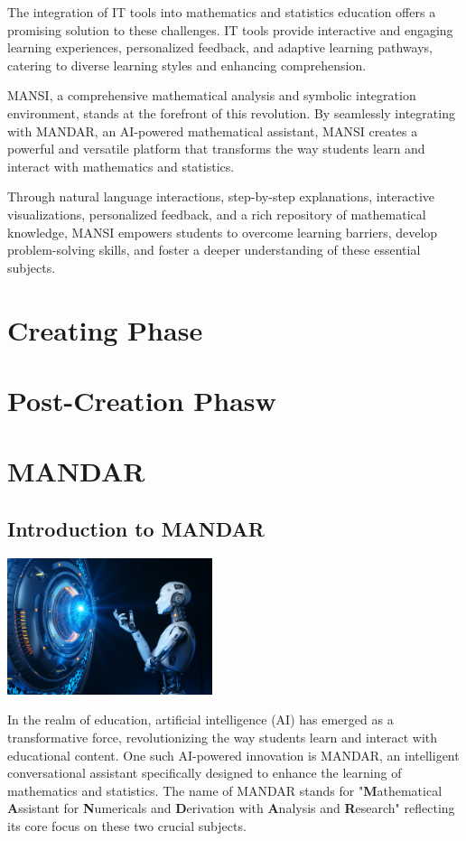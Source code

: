\documentclass[20pt]{report}
\begin{document}
The integration of IT tools into mathematics and statistics education offers a promising solution to these challenges. IT tools provide interactive and engaging learning experiences, personalized feedback, and adaptive learning pathways, catering to diverse learning styles and enhancing comprehension.

MANSI, a comprehensive mathematical analysis and symbolic integration environment, stands at the forefront of this revolution. By seamlessly integrating with MANDAR, an AI-powered mathematical assistant, MANSI creates a powerful and versatile platform that transforms the way students learn and interact with mathematics and statistics.

Through natural language interactions, step-by-step explanations, interactive visualizations, personalized feedback, and a rich repository of mathematical knowledge, MANSI empowers students to overcome learning barriers, develop problem-solving skills, and foster a deeper understanding of these essential subjects.
\chapter{Creating Phase}
\chapter{Post-Creation Phasw}
\chapter{MANDAR}

\section{Introduction to MANDAR}
\begin{center}
    \includegraphics[height=4cm]{AIbot.jpg}
\end{center}
In the realm of education, artificial intelligence (AI) has emerged as a transformative force, revolutionizing the way students learn and interact with educational content. One such AI-powered innovation is MANDAR, an intelligent conversational assistant specifically designed to enhance the learning of mathematics and statistics. The name of MANDAR stands for "\textbf{M}athematical \textbf{A}ssistant for \textbf{N}umericals and \textbf{D}erivation with \textbf{A}nalysis and \textbf{R}esearch" reflecting its core focus on these two crucial subjects.
\end{document}
